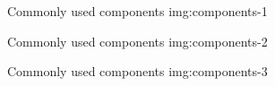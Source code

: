 {Commonly used components}
{img:components-1}

{Commonly used components}
{img:components-2}

{Commonly used components}
{img:components-3}
